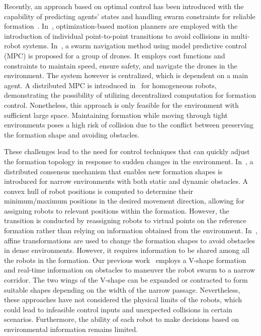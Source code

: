 Recently, an approach based on optimal control has been introduced with the capability of predicting agents' states and handling swarm constraints for reliable formation~\cite{Beaver2021,Soria2021,8950150}. In~\cite{7828016,Wu2020}, optimization-based motion planners are employed with the introduction of individual point-to-point transitions to avoid collisions in multi-robot systems. In~\cite{Soria2021}, a swarm navigation method using model predictive control (MPC) is proposed for a group of drones. It employs cost functions and constraints to maintain speed, ensure safety, and navigate the drones in the environment. The system however is centralized, which is dependent on a main agent. A distributed MPC is introduced in~\cite{9562281} for homogeneous robots, demonstrating the possibility of utilizing decentralized computation for formation control. Nonetheless, this approach is only feasible for the environment with sufficient large space. Maintaining formation while moving through tight environments poses a high risk of collision due to the conflict between preserving the formation shape and avoiding obstacles.

These challenges lead to the need for control techniques that can quickly adjust the formation topology in response to sudden changes in the environment. In~\cite{AlonsoMora2018}, a distributed consensus mechanism that enables new formation shapes is introduced for narrow environments with both static and dynamic obstacles. A convex hull of robot positions is computed to determine their minimum/maximum positions in the desired movement direction, allowing for assigning robots to relevant positions within the formation. However, the transition is conducted by reassigning robots to virtual points on the reference formation rather than relying on information obtained from the environment. In~\cite{9981858}, affine transformations are used to change the formation shapes to avoid obstacles in dense environments. However, it requires information to be shared among all the robots in the formation. Our previous work~\cite{10417519} employs a V-shape formation and real-time information on obstacles to maneuver the robot swarm to a narrow corridor. The two wings of the V-shape can be expanded or contracted to form suitable shapes depending on the width of the narrow passage. Nevertheless, these approaches have not considered the physical limits of the robots, which could lead to infeasible control inputs and unexpected collisions in certain scenarios. Furthermore, the ability of each robot to make decisions based on environmental information remains limited.


